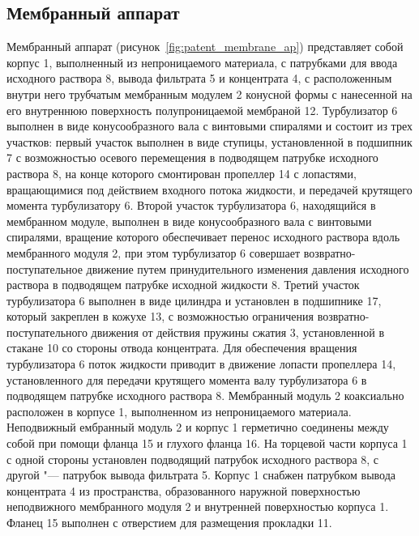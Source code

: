 \subsection{Мембранный аппарат}

Мембранный аппарат (рисунок~\ref{fig:patent_membrane_ap}) представляет собой корпус 1, выполненный из
непроницаемого материала, с патрубками для ввода исходного раствора 8, вывода фильтрата 5 и концентрата 4, с расположенным внутри него трубчатым мембранным модулем 2 конусной формы с нанесенной на его внутреннюю поверхность полупроницаемой мембраной 12.
Турбулизатор 6 выполнен в виде конусообразного вала с винтовыми спиралями и состоит из трех участков: первый участок выполнен в виде ступицы, установленной в подшипник 7 с возможностью осевого перемещения в подводящем патрубке исходного раствора 8, на конце которого смонтирован пропеллер 14 с лопастями, вращающимися под действием входного потока жидкости, и передачей крутящего момента турбулизатору 6.
Второй участок турбулизатора 6, находящийся в мембранном модуле, выполнен в виде конусообразного вала с винтовыми спиралями, вращение которого обеспечивает перенос исходного раствора вдоль мембранного модуля 2, при этом турбулизатор 6 совершает возвратно-поступательное движение путем принудительного изменения давления исходного раствора в подводящем патрубке исходной жидкости 8. 
Третий участок турбулизатора 6 выполнен в виде цилиндра и установлен в подшипнике 17, который закреплен в кожухе 13, с возможностью ограничения возвратно-поступательного движения от действия пружины сжатия 3, установленной в стакане 10 со стороны отвода концентрата.
Для обеспечения вращения турбулизатора 6 поток жидкости приводит в движение лопасти пропеллера 14, установленного для передачи крутящего момента валу турбулизатора 6 в подводящем патрубке исходного раствора 8.
Мембранный модуль 2 коаксиально расположен в корпусе 1, выполненном из непроницаемого материала.
Неподвижный ембранный модуль 2 и корпус 1 герметично соединены между собой при помощи фланца 15 и глухого фланца 16.
На торцевой части корпуса 1 с одной стороны установлен подводящий патрубок исходного раствора 8, с другой "--- патрубок вывода фильтрата 5.
Корпус 1 снабжен патрубком вывода концентрата 4 из пространства, образованного наружной поверхностью неподвижного мембранного модуля 2 и внутренней поверхностью корпуса 1.
Фланец 15 выполнен с отверстием для размещения прокладки 11.


